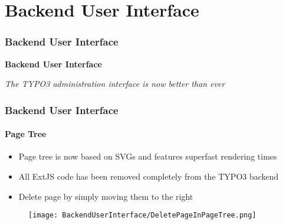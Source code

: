 %

\section{Backend User Interface}
\begin{frame}[fragile]
	\frametitle{Backend User Interface}

	\begin{center}\huge{\color{typo3darkgrey}\textbf{Backend User Interface}}\end{center}
	\begin{center}\large{\textit{The TYPO3 administration interface is now better than ever}}\end{center}

\end{frame}


\begin{frame}[fragile]
	\frametitle{Backend User Interface}
	\framesubtitle{Page Tree}

	\begin{itemize}
		\item Page tree is now based on SVGs and features superfast rendering times
		\item All ExtJS code has been removed completely from the TYPO3 backend
		\item Delete page by simply moving them to the right
	\end{itemize}

	\begin{figure}
		\texttt{[image: BackendUserInterface/DeletePageInPageTree.png]}
	\end{figure}

\end{frame}


